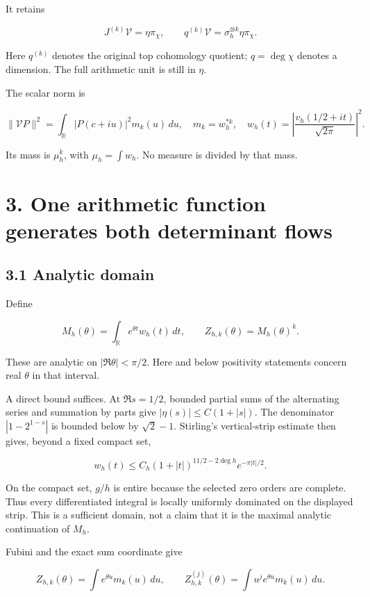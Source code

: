 \documentclass[
  11pt,
]{article}
\begin{document}
It retains

\[
J^{(k)}\mathcal V=\eta\pi_\chi,\qquad
q^{(k)}\mathcal V=\sigma_h^{\otimes k}\eta\pi_\chi.
\tag{5}
\]

Here \(q^{(k)}\) denotes the original top cohomology quotient;
\(q=\deg\chi\) denotes a dimension. The full arithmetic unit is still in
\(\eta\).

The scalar norm is

\[
\|\mathcal VP\|^2=\int_{\mathbb R}|P(c+iu)|^2m_k(u)\,du,
\quad m_k=w_h^{*k},\quad
w_h(t)=\left|\frac{v_h(1/2+it)}{\sqrt{2\pi}}\right|^2.
\tag{6}
\]

Its mass is \(\mu_h^k\), with \(\mu_h=\int w_h\). No measure is divided
by that mass.

\section{3. One arithmetic function generates both determinant
flows}\label{one-arithmetic-function-generates-both-determinant-flows}

\subsection{3.1 Analytic domain}\label{analytic-domain}

Define

\[
M_h(\theta)=\int_{\mathbb R}e^{\theta t}w_h(t)\,dt,
\qquad Z_{h,k}(\theta)=M_h(\theta)^k.
\tag{7}
\]

These are analytic on \(|\Re\theta|<\pi/2\). Here and below positivity
statements concern real \(\theta\) in that interval.

A direct bound suffices. At \(\Re s=1/2\), bounded partial sums of the
alternating series and summation by parts give
\(|\eta(s)|\le C(1+|s|)\). The denominator \(|1-2^{1-s}|\) is bounded
below by \(\sqrt2-1\). Stirling's vertical-strip estimate then gives,
beyond a fixed compact set,

\[
w_h(t)\le C_h(1+|t|)^{11/2-2\deg h}e^{-\pi|t|/2}.
\]

On the compact set, \(g/h\) is entire because the selected zero orders
are complete. Thus every differentiated integral is locally uniformly
dominated on the displayed strip. This is a sufficient domain, not a
claim that it is the maximal analytic continuation of \(M_h\).

Fubini and the exact sum coordinate give

\[
Z_{h,k}(\theta)=\int e^{\theta u}m_k(u)\,du,
\qquad
Z_{h,k}^{(j)}(\theta)=\int u^je^{\theta u}m_k(u)\,du.
\tag{8}
\]
\end{document}
